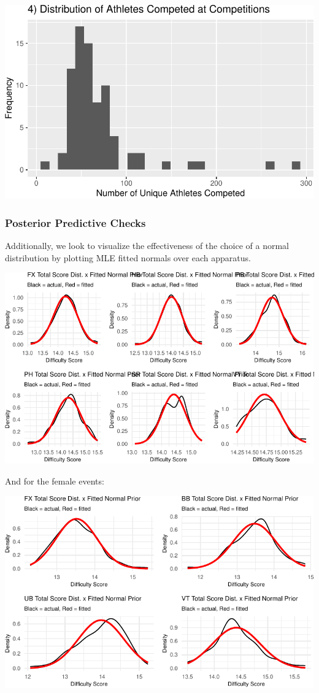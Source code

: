 \documentclass[
  10.5pt,
  letterpaper,
  DIV=11,
  numbers=noendperiod]{scrartcl}
\begin{document}
\includegraphics{Main_files/figure-pdf/unique-athletes-4.pdf}

\hypertarget{posterior-predictive-checks}{%
\subsubsection{Posterior Predictive
Checks}\label{posterior-predictive-checks}}

Additionally, we look to visualize the effectiveness of the choice of a
normal distribution by plotting MLE fitted normals over each apparatus.

\includegraphics{Main_files/figure-pdf/unnamed-chunk-3-1.pdf}

And for the female events:

\includegraphics{Main_files/figure-pdf/unnamed-chunk-4-1.pdf}
\end{document}
